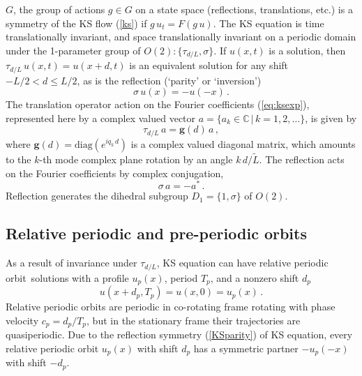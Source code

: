 \documentclass[aip,cha,showpacs,reprint]{revtex4-1} %
\newcommand{\beq}{\begin{equation}}
\newcommand{\eeq}{\end{equation}}
\newcommand{\refeq}  [1] {(\ref{#1})}
\newcommand{\etc}{{etc.}}
\newcommand{\Refl}{\ensuremath{\sigma}}
\newcommand{\period}[1]{{\ensuremath{T_{#1}}}}
\newcommand{\Shift}{\ensuremath{\tau}}
\newcommand{\shift}{\ensuremath{d}}
\newcommand{\rpo}{rela\-ti\-ve periodic orbit}
\newcommand{\Rpo}{Rela\-ti\-ve periodic orbit}
\newcommand{\velRel}{\ensuremath{c}}    %
\begin{document}
$G$, the group of actions $ g \in G $ on a
state space (reflections, translations, \etc) is a symmetry of the KS
flow \refeq{ks} if $g\,u_t = F(g\,u)$.
The KS equation is time translationally invariant, and space translationally invariant
on a periodic domain under
the 1-parameter group of
$O(2): \{\Shift_{\shift/L},\Refl \}$.
If $u(x,t)$ is a solution, then
$\Shift_{\shift/L}\, u(x,t) = u(x+\shift,t)$
is an equivalent solution for any shift
$-L/2 < \shift \leq L/2$,
as is the
reflection (`parity' or `inversion')
\beq
    \Refl \, u(x) = -u(-x)
\,.
\label{KSparity}
\eeq
The translation operator action on the Fourier coefficients \refeq{eq:ksexp},
represented here by a complex valued vector
$a = \{a_k\in\mathbb{C}\,|\,k = 1, 2, \ldots\}$, is given by
\beq
  \Shift_{\shift/L}\, a = \mathbf{g}(\shift) \, a \,,
  \label{eq:shiftFour}
\eeq
where $\mathbf{g}(\shift) = \mbox{diag}( e^{i q_k\, \shift} )$ is a complex
valued diagonal matrix, which amounts to the $k$-th mode complex plane
rotation by an angle $k\, \shift /\tilde{L}$.  The reflection acts on
the Fourier coefficients by complex conjugation,
\beq
  \Refl \, a = -a^\ast
\,.
\label{FModInvSymm}
\eeq
Reflection generates the dihedral subgroup $D_1 = \{1, \Refl\}$
of $O(2)$.

\subsection{Relative periodic and pre-periodic orbits}
\label{s:rpoNumerics}

As a result of invariance under $\Shift_{\shift/L}$,
KS equation can have \rpo\ solutions
with a profile $u_p(x)$, period $\period{p}$, and a
nonzero shift $\shift_p$
\beq
  u(x+\shift_p,\period{p}) = u(x,0) = u_p(x)
\,.
\label{eq:KSrpos}
\eeq
{\Rpo s} are periodic in
co-rotating frame rotating with phase velocity
$\velRel_p=\shift_p/\period{p}$, but in the stationary frame
their trajectories are quasiperiodic.  Due to the reflection symmetry
\refeq{KSparity} of KS equation, every {\rpo} $u_p(x)$ with shift
$\shift_p$ has a symmetric partner $-u_p(-x)$ with shift $-\shift_p$.
\end{document}
